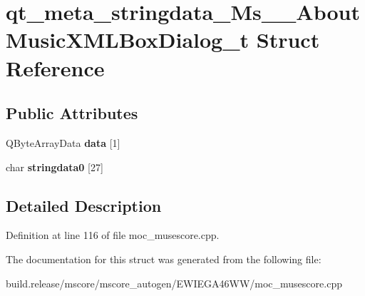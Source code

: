 \hypertarget{structqt__meta__stringdata___ms_____about_music_x_m_l_box_dialog__t}{}\section{qt\+\_\+meta\+\_\+stringdata\+\_\+\+Ms\+\_\+\+\_\+\+About\+Music\+X\+M\+L\+Box\+Dialog\+\_\+t Struct Reference}
\label{structqt__meta__stringdata___ms_____about_music_x_m_l_box_dialog__t}
\subsection*{Public Attributes}
\begin{DoxyCompactItemize}
\item 
\mbox{\label{structqt__meta__stringdata___ms_____about_music_x_m_l_box_dialog__t_a5f2705f4c67adc8837ed3a910754782e}} 
Q\+Byte\+Array\+Data {\bfseries data} \mbox{[}1\mbox{]}
\item 
\mbox{\label{structqt__meta__stringdata___ms_____about_music_x_m_l_box_dialog__t_af9f4ecc8e0c460b4af90d6ff0d79db19}} 
char {\bfseries stringdata0} \mbox{[}27\mbox{]}
\end{DoxyCompactItemize}


\subsection{Detailed Description}


Definition at line 116 of file moc\+\_\+musescore.\+cpp.



The documentation for this struct was generated from the following file\+:\begin{DoxyCompactItemize}
\item 
build.\+release/mscore/mscore\+\_\+autogen/\+E\+W\+I\+E\+G\+A46\+W\+W/moc\+\_\+musescore.\+cpp\end{DoxyCompactItemize}
